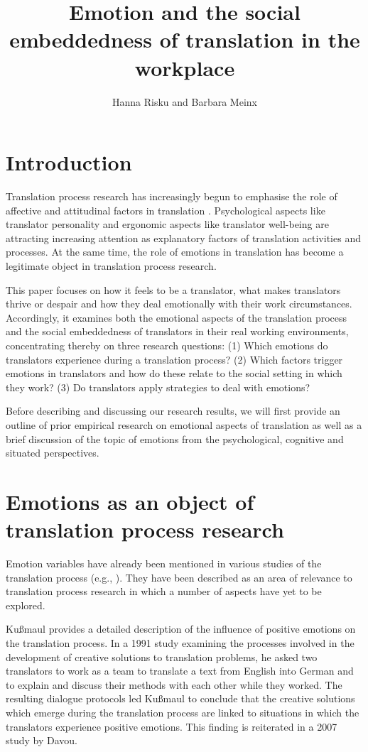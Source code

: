 \documentclass[output=paper]{langscibook}
\author{Hanna Risku\affiliation{University of Vienna} and Barbara Meinx\affiliation{Oesterreichische Nationalbank}}
\title{Emotion and the social embeddedness of translation in the workplace}
\begin{document}
\maketitle

\section{Introduction} 
Translation process research has increasingly begun to emphasise the role of affective and attitudinal factors in translation \citep{Laukkanen1996}. Psychological aspects like translator personality \citep{Hubscher-Davidson2009} and ergonomic aspects like translator well-being \citep{Ehrensberger-Dow2018} are attracting increasing attention as explanatory factors of translation activities and processes. At the same time, the role of emotions in translation has become a legitimate object in translation process research.

This paper focuses on how it feels to be a translator, what makes translators thrive or despair and how they deal emotionally with their work circumstances. Accordingly, it examines both the emotional aspects of the translation process and the social embeddedness of translators in their real working environments, concentrating thereby on three research questions: (1) Which emotions do translators experience during a translation process? (2) Which factors trigger emotions in translators and how do these relate to the social setting in which they work? (3) Do translators apply strategies to deal with emotions?

Before describing and discussing our research results, we will first provide an outline of prior empirical research on emotional aspects of translation as well as a brief discussion of the topic of emotions from the psychological, cognitive and situated perspectives.

\section{Emotions as an object of translation process research}
Emotion variables have already been mentioned in various studies of the translation process (e.g., \citealp{Kußmaul1991, Tirkkonen-Condit1996, Jääskeläinen1996, Davou2007, RojoLópez2014, RojoLópez2016, Hubscher-Davidson2009, Hubscher-Davidson2013, Lehr2014}). They have been described as an area of relevance to translation process research in which a number of aspects have yet to be explored.

Kußmaul provides a detailed description of the influence of positive emotions on the translation process. In a 1991 study examining the processes involved in the development of creative solutions to translation problems, he asked two translators to work as a team to translate a text from English into German and to explain and discuss their methods with each other while they worked. The resulting dialogue protocols led Kußmaul to conclude that the creative solutions which emerge during the translation process are linked to situations in which the translators experience positive emotions. This finding is reiterated in a 2007 study by Davou.
\end{document}
